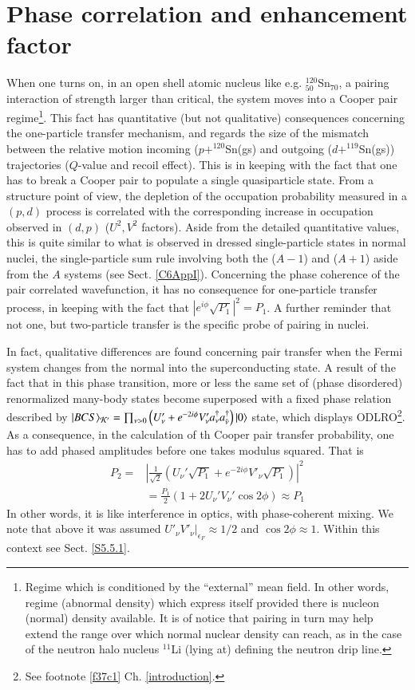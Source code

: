 \section{Phase correlation and enhancement factor}\label{S4.3}
When one turns on, in an open shell atomic nucleus like e.g. $^{120}_{50}$Sn$_{70}$, a pairing interaction of strength larger than critical, the system moves into a Cooper pair regime\footnote{Regime which is conditioned by the ``external'' mean field. In other words, regime (abnormal density) which express itself provided there is nucleon (normal) density available. It is of notice that pairing in turn may help extend the range over which normal nuclear density can reach, as in the case of the neutron halo nucleus $^{11}$Li (lying at) defining  the neutron drip line.}. This fact has quantitative (but not qualitative)  consequences concerning the one-particle transfer mechanism,  and regards the size of the mismatch between the relative motion incoming ($p+^{120}$Sn(gs) and outgoing ($d+^{119}$Sn(gs)) trajectories ($Q$-value and recoil effect). This is in keeping with the fact that one has to break a Cooper pair to populate a single  quasiparticle state. From a structure point of view, the depletion of the occupation probability measured in a $(p,d)$ process is correlated with the corresponding increase in occupation observed in $(d,p)$ ($U^2,V^2$ factors). Aside  from the detailed quantitative values, this is quite similar to what is observed in dressed single-particle states in normal nuclei, the single-particle sum rule involving both the ($A-1$) and ($A+1$) aside from the $A$ systems (see Sect. \ref{C6AppI}). Concerning the phase coherence of the pair correlated wavefunction, it has no consequence for one-particle transfer process, in keeping with the fact that $|e^{i\phi}\sqrt{P_1}|^2=P_1$. A further reminder  that not one, but two-particle transfer is the specific probe of pairing in nuclei.


In fact, qualitative differences are found concerning pair transfer  when the Fermi system changes from the normal into the superconducting state. A result of the fact that in this phase transition, more or less the same set of (phase disordered) renormalized many-body states  become superposed with a fixed phase relation described by $|{BCS} \rangle_{\mathcal K'}=\prod_{\nu>0}\left(U'_\nu+e^{-2i\phi} V'_\nu a_\nu^\dagger a^\dagger_{\tilde\nu}\right)|{0} \rangle$ state, which displays ODLRO\footnote{See footnote \ref{f37c1} Ch. \ref{introduction}.}. As a consequence, in the calculation of th Cooper pair transfer probability, one has to add phased amplitudes before one takes modulus squared. That is
\begin{align}\label{eq3.2.19}
\nonumber P_2=&\left|\frac{1}{\sqrt{2}}\left(U_\nu'\sqrt{P_1}+e^{-2i\phi}V'_\nu\sqrt{P_1}\right)\right|^2\\
&=\frac{P_1}{2}  \left(1+2U_\nu'V_\nu'\cos2\phi\right)\approx P_1
\end{align}
In other words, it is like interference in optics, with phase-coherent mixing. We note that above it was assumed $U'_\nu V'_\nu|_{\epsilon_F}\approx1/2$ and $\cos2\phi\approx1$. Within this context see Sect. \ref{S5.5.1}.
 
